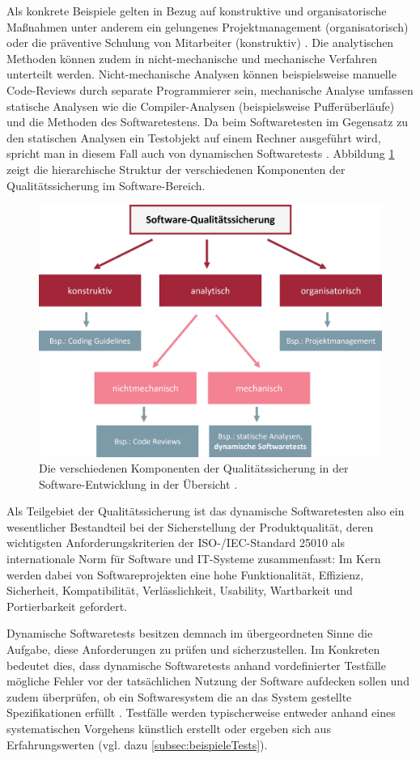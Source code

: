 Als konkrete Beispiele gelten in Bezug auf konstruktive und organisatorische Maßnahmen unter anderem ein gelungenes Projektmanagement (organisatorisch) oder die präventive Schulung von Mitarbeiter (konstruktiv) \cite[S. 272]{ludewig2010software}. Die analytischen Methoden können zudem in nicht-mechanische und mechanische Verfahren unterteilt werden. Nicht-mechanische Analysen können beispielsweise manuelle Code-Reviews durch separate Programmierer sein, mechanische Analyse umfassen statische Analysen wie die Compiler-Analysen (beispielsweise Pufferüberläufe) und die Methoden des Softwaretestens. Da beim Softwaretesten im Gegensatz zu den statischen Analysen ein Testobjekt auf einem Rechner ausgeführt wird, spricht man in diesem Fall auch von dynamischen Softwaretests \cite[S. 135]{spillner2010basiswissen}. Abbildung \ref{fig:qualitaetssicherung} zeigt die hierarchische Struktur der verschiedenen Komponenten der Qualitätssicherung im Software-Bereich.

\begin{figure}[!h]
\centering
\includegraphics[width=0.5\columnwidth]{images/Qualitaetssicherung_Uebersicht.jpg}
\caption{Die verschiedenen Komponenten der Qualitätssicherung in der Software-Entwicklung in der Übersicht \cite[S. 271]{ludewig2010software}.}
\label{fig:qualitaetssicherung}
\end{figure}


Als Teilgebiet der Qualitätssicherung ist das dynamische Softwaretesten also ein wesentlicher Bestandteil bei der Sicherstellung der Produktqualität, deren wichtigsten Anforderungskriterien der ISO-/IEC-Standard 25010 \cite{ISO25010} als internationale Norm für Software und IT-Systeme zusammenfasst: Im Kern werden dabei von Softwareprojekten eine hohe Funktionalität, Effizienz, Sicherheit, Kompatibilität, Verlässlichkeit, Usability, Wartbarkeit und Portierbarkeit gefordert.

Dynamische Softwaretests besitzen demnach im übergeordneten Sinne die Aufgabe, diese Anforderungen zu prüfen und sicherzustellen. Im Konkreten bedeutet dies, dass dynamische Softwaretests anhand vordefinierter Testfälle mögliche Fehler vor der tatsächlichen Nutzung der Software aufdecken sollen und zudem überprüfen, ob ein Softwaresystem die an das System gestellte Spezifikationen erfüllt \cite[S. 246]{sommerville2012software-engineering}. Testfälle werden typischerweise entweder anhand eines systematischen Vorgehens künstlich erstellt oder ergeben sich aus Erfahrungswerten (vgl. dazu \autoref{subsec:beispieleTests}).  

